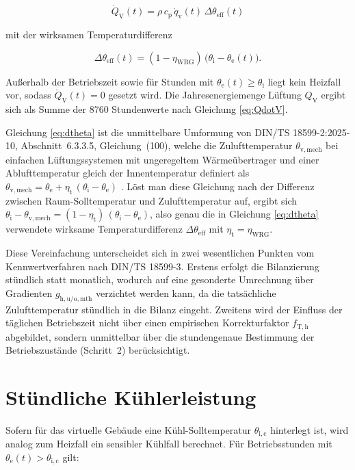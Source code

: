 \documentclass{scrreprt}
\begin{document}
\begin{equation}\label{eq:QdotV}
    \dot Q_{\mathrm{V}}(t) = \rho \, c_{\mathrm{p}} \, \dot q_{\mathrm{v}}(t) \, \Delta\theta_{\mathrm{eff}}(t)
\end{equation}

mit der wirksamen Temperaturdifferenz

\begin{equation}\label{eq:dtheta}
    \Delta\theta_{\mathrm{eff}}(t) = (1 - \eta_{\mathrm{WRG}}) \, \bigl(\theta_{\mathrm{i}} - \theta_{\mathrm{e}}(t)\bigr).
\end{equation}

Außerhalb der Betriebszeit sowie für Stunden mit
$\theta_{\mathrm{e}}(t) \geq \theta_{\mathrm{i}}$ liegt kein Heizfall
vor, sodass $\dot Q_{\mathrm{V}}(t) = 0$ gesetzt wird. Die
Jahresenergiemenge Lüftung $Q_{\mathrm{V}}$ ergibt sich als Summe der
8760 Stundenwerte nach Gleichung \eqref{eq:QdotV}.

Gleichung \eqref{eq:dtheta} ist die unmittelbare Umformung von
DIN/TS 18599-2:2025-10, Abschnitt~6.3.3.5, Gleichung~(100), welche die
Zulufttemperatur $\theta_{\mathrm{v,mech}}$ bei einfachen
Lüftungssystemen mit ungeregeltem Wärmeübertrager und einer
Ablufttemperatur gleich der Innentemperatur definiert als
$\theta_{\mathrm{v,mech}} = \theta_{\mathrm{e}} + \eta_{\mathrm{t}} \,
(\theta_{\mathrm{i}} - \theta_{\mathrm{e}})$
\parencite{DIN185992}. Löst man diese Gleichung nach der Differenz
zwischen Raum-Solltemperatur und Zulufttemperatur auf, ergibt sich
$\theta_{\mathrm{i}} - \theta_{\mathrm{v,mech}} = (1 -
\eta_{\mathrm{t}}) \, (\theta_{\mathrm{i}} - \theta_{\mathrm{e}})$,
also genau die in Gleichung \eqref{eq:dtheta} verwendete wirksame
Temperaturdifferenz $\Delta\theta_{\mathrm{eff}}$ mit
$\eta_{\mathrm{t}} = \eta_{\mathrm{WRG}}$.

Diese Vereinfachung unterscheidet sich in zwei wesentlichen Punkten
vom Kennwertverfahren nach DIN/TS 18599-3. Erstens erfolgt die
Bilanzierung stündlich statt monatlich, wodurch auf eine gesonderte
Umrechnung über Gradienten $g_{\mathrm{h,u/o,mth}}$
\parencite{DIN185993} verzichtet werden kann, da die tatsächliche
Zulufttemperatur stündlich in die Bilanz eingeht. Zweitens wird der
Einfluss der täglichen Betriebszeit nicht über einen empirischen
Korrekturfaktor $f_{\mathrm{T,h}}$ \parencite{DIN185993} abgebildet,
sondern unmittelbar über die stundengenaue Bestimmung der
Betriebszustände (Schritt~2) berücksichtigt.

\section{Stündliche Kühlerleistung}
Sofern für das virtuelle Gebäude eine Kühl-Solltemperatur
$\theta_{\mathrm{i,c}}$ hinterlegt ist, wird analog zum Heizfall ein
sensibler Kühlfall berechnet. Für Betriebsstunden mit
$\theta_{\mathrm{e}}(t) > \theta_{\mathrm{i,c}}$ gilt:
\end{document}
